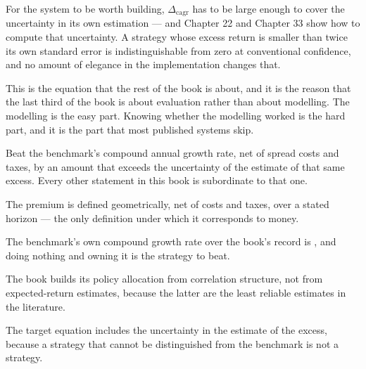 For the system to be worth building, \(\Delta_{\mathrm{cagr}}\) has to be
large enough to cover the uncertainty in its own estimation --- and
Chapter 22 and Chapter 33 show how to compute that uncertainty. A strategy
whose excess return is smaller than twice its own standard error is
indistinguishable from zero at conventional confidence, and no amount of
elegance in the implementation changes that.

This is the equation that the rest of the book is about, and it is the
reason that the last third of the book is about evaluation rather than
about modelling. The modelling is the easy part. Knowing whether the
modelling worked is the hard part, and it is the part that most published
systems skip.

\begin{takeaway}
Beat the benchmark's compound annual growth rate, net of spread costs and
taxes, by an amount that exceeds the uncertainty of the estimate of that
same excess. Every other statement in this book is subordinate to that one.
\end{takeaway}

\begin{keytakeaways}
\item The premium is defined geometrically, net of costs and taxes, over a
stated horizon --- the only definition under which it corresponds to money.
\item The benchmark's own compound growth rate over the book's record is
\numSpyFullCAGR{}, and doing nothing and owning it is the strategy to beat.
\item The book builds its policy allocation from correlation structure, not
from expected-return estimates, because the latter are the least reliable
estimates in the literature.
\item The target equation includes the uncertainty in the estimate of the
excess, because a strategy that cannot be distinguished from the benchmark
is not a strategy.
\end{keytakeaways}
